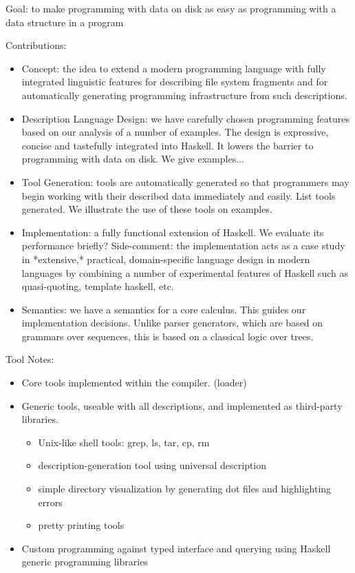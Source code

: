 Goal: to make programming with data on disk as easy as programming
with a data structure in a program

Contributions:

\begin{itemize}
\item Concept:  the idea to extend a modern programming language with
fully integrated linguistic features for describing file system fragments
and for automatically generating programming infrastructure from such 
descriptions.

\item Description Language Design: we have carefully chosen \forest{}
  programming features based on our analysis of a number of examples.
  The design is expressive, concise and tastefully integrated into
  Haskell.  It lowers the barrier to programming with data on disk.
  We give examples...

\item Tool Generation: tools are automatically generated so that
  programmers may begin working with their described data immediately
  and easily.  List tools generated.  We illustrate the use of these
  tools on examples.

\item Implementation: a fully functional extension of Haskell.  We
  evaluate its performance briefly?  Side-comment: the implementation
  acts as a case study in *extensive,* practical, domain-specific
  language design in modern languages by combining a number of
  experimental features of Haskell such as quasi-quoting, template
  haskell, etc.

\item Semantics: we have a semantics for a core calculus.  This guides
  our implementation decisions.  Unlike parser generators, which are
  based on grammars over sequences, this is based on a classical logic
  over trees.
\end{itemize}

Tool Notes:

\begin{itemize}
\item Core tools implemented within the compiler. (loader)
\item Generic tools, useable with all descriptions, and implemented as
  third-party libraries.
\begin{itemize}
\item Unix-like shell tools: grep, ls, tar, cp, rm
\item description-generation tool using universal description
\item simple directory visualization by generating dot files and highlighting errors
\item pretty printing tools
\end{itemize}
\item Custom programming against typed interface and querying using Haskell generic programming libraries
\end{itemize}
